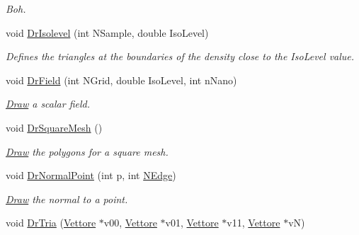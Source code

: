 \begin{DoxyCompactItemize}
\begin{DoxyCompactList}\small\item\em \-Boh. \end{DoxyCompactList}\item 
void \hyperlink{classElPoly_ac33065bd12bc1315d48c4fc60acf3e99}{\-Dr\-Isolevel} (int \-N\-Sample, double \-Iso\-Level)
\begin{DoxyCompactList}\small\item\em \-Defines the triangles at the boundaries of the density close to the \-Iso\-Level value. \end{DoxyCompactList}\item 
\hypertarget{classElPoly_ae5093f79e99758c116e6957ce8bd5bce}{void \hyperlink{classElPoly_ae5093f79e99758c116e6957ce8bd5bce}{\-Dr\-Field} (int \-N\-Grid, double \-Iso\-Level, int n\-Nano)}\label{classElPoly_ae5093f79e99758c116e6957ce8bd5bce}

\begin{DoxyCompactList}\small\item\em \hyperlink{classDraw}{\-Draw} a scalar field. \end{DoxyCompactList}\item 
\hypertarget{classElPoly_a7ee6e038b2bc5f4d9440118b807e115e}{void \hyperlink{classElPoly_a7ee6e038b2bc5f4d9440118b807e115e}{\-Dr\-Square\-Mesh} ()}\label{classElPoly_a7ee6e038b2bc5f4d9440118b807e115e}

\begin{DoxyCompactList}\small\item\em \hyperlink{classDraw}{\-Draw} the polygons for a square mesh. \end{DoxyCompactList}\item 
\hypertarget{classElPoly_a6caa02ea64327736aab6533720461acc}{void \hyperlink{classElPoly_a6caa02ea64327736aab6533720461acc}{\-Dr\-Normal\-Point} (int p, int \hyperlink{classVarData_ae2e67b49132b33a026b19c647cbf4f3c}{\-N\-Edge})}\label{classElPoly_a6caa02ea64327736aab6533720461acc}

\begin{DoxyCompactList}\small\item\em \hyperlink{classDraw}{\-Draw} the normal to a point. \end{DoxyCompactList}\item 
\hypertarget{classElPoly_adcc85b143b5bbcb89aa5eabeb33b9ed6}{void \hyperlink{classElPoly_adcc85b143b5bbcb89aa5eabeb33b9ed6}{\-Dr\-Tria} (\hyperlink{classVettore}{\-Vettore} $\ast$v00, \hyperlink{classVettore}{\-Vettore} $\ast$v01, \hyperlink{classVettore}{\-Vettore} $\ast$v11, \hyperlink{classVettore}{\-Vettore} $\ast$v\-N)}\label{classElPoly_adcc85b143b5bbcb89aa5eabeb33b9ed6}


\end{DoxyCompactItemize}
